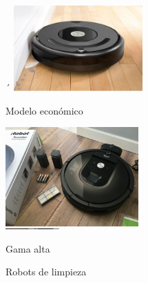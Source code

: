 \begin{figure}[ht!]
	\centering
	\begin{minipage}{0.3\linewidth}
		\centering´
		\includegraphics[width=\linewidth]{figs/gama-baja.png}
		\caption*{\centering Modelo económico \cite{plaza_robotica_servicio}}
	\end{minipage}
	\hspace{3cm}
	\begin{minipage}{0.3\linewidth}
		\centering
		\includegraphics[width=\linewidth]{figs/gama-alta.png}
		\caption*{\centering Gama alta \cite{plaza_robotica_servicio}}
	\end{minipage}
	\caption{Robots de limpieza}
	\label{fig:roblimpieza}
\end{figure}


